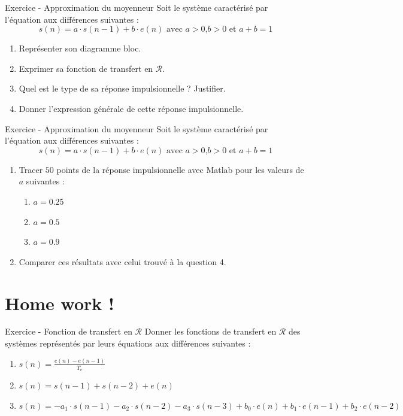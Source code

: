 \documentclass[a4paper,11pt]{beamer}
\newcounter{exampleBlockCounter}
\begin{document}
\begin{frame}
\begin{exampleblock}{Exercice  - Approximation du
moyenneur} 
Soit le système caractérisé par l'équation aux différences suivantes :
$$
s(n) = a\cdot s(n-1) + b\cdot e(n)\text{ avec }a>0\text{,
}b>0\text{ et }a + b = 1 $$
\begin{enumerate}
  \item Représenter son diagramme bloc.
  \item Exprimer sa fonction de transfert en $\mathcal{R}$.
  \item Quel est le type de sa réponse impulsionnelle ? Justifier.
  \item Donner l'expression générale de cette réponse impulsionnelle.
\end{enumerate}
\end{exampleblock}
\end{frame}

\begin{frame}
\begin{exampleblock}{Exercice  - Approximation du
moyenneur} 
Soit le système caractérisé par l'équation aux différences suivantes :
$$
s(n) = a\cdot s(n-1) + b\cdot e(n)\text{ avec }a>0\text{,
}b>0\text{ et }a + b = 1 $$
\begin{enumerate}
  \justifying
  \setcounter{enumi}{4}
  \item Tracer $50$ points de la réponse impulsionnelle avec Matlab pour les
  valeurs de $a$ suivantes :
  \begin{enumerate}
    \item $a=0.25$
    \item $a=0.5$
    \item $a=0.9$
  \end{enumerate}
  \item Comparer ces résultats avec celui trouvé à la question 4.
\end{enumerate}
\end{exampleblock}
\end{frame}

\section{Home work !}
\begin{frame}
\begin{exampleblock}{Exercice  - Fonction de
transfert en $\mathcal{R}$}
\justifying
Donner les fonctions de transfert en $\mathcal{R}$ des systèmes représentés par
leurs équations aux différences suivantes :
\begin{enumerate}
  \item $s(n)=\frac{e(n) - e(n-1)}{T_e}$
  \item $s(n)=s(n-1)+s(n-2)+e(n)$
  \item $s(n)= - a_1\cdot s(n-1) - a_2\cdot s(n-2) - a_3\cdot s(n-3) + b_0\cdot
  e(n)+ b_1\cdot  e(n-1)+ b_2\cdot e(n-2)$
\end{enumerate}
\end{exampleblock}
\end{frame}
\end{document}
